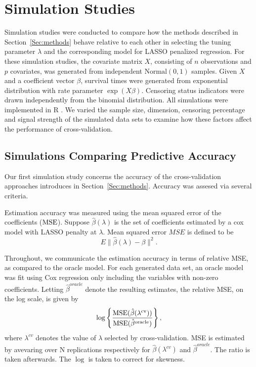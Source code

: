 \section{Simulation Studies}

Simulation studies were conducted to compare how the methods described in Section~\ref{Sec:methods} behave relative to each other in selecting the tuning parameter $\lambda$ and the corresponding model for LASSO penalized regression. For these simulation studies, the covariate matrix $X$, consisting of $n$ observations and $p$ covariates, was generated from independent $\text{Normal}(0, 1)$ samples. Given $X$ and a coefficient vector $\beta$, survival times were generated from exponential distribution with rate parameter $\exp(X\beta)$. Censoring status indicators were drawn independently from the binomial distribution. All simulations were implemented in R \citep{R}. We varied the sample size, dimension, censoring percentage and signal strength of the simulated data sets to examine how these factors affect the performance of cross-validation.
   
\subsection {Simulations Comparing Predictive Accuracy}
\label{Sec:accuracy}

Our first simulation study concerns the accuracy of the cross-validation approaches introduces in Section~\ref{Sec:methods}.  Accuracy was assesed via several criteria.

Estimation accuracy was measured using the mean squared error of the coefficients ($\textrm{MSE}$). Suppose $\hat{\beta}(\lambda)$ is the set of coefficients estimated by a cox model with LASSO penalty at $\lambda$. Mean squared error $MSE$ is defined to be 
\begin{equation}
E\| \hat{\beta}(\lambda) - \beta \| ^2.
\end{equation}

Throughout, we communicate the estimation accuracy in terms of relative MSE, as compared to the oracle model.  For each generated data set, an oracle model was fit using Cox regression only including the variables with non-zero coefficients. Letting $\hat{\beta}^{oracle}$ denote the resulting estimates, the relative MSE, on the log scale, is given by
\begin{equation}
\log\left\{ \frac{\textrm{MSE}(\hat{\beta}(\lambda^{\text{cv}}))}{\textrm{MSE}(\hat{\beta}^{\text{oracle}})} \right\},
\end{equation}
where $\lambda^{cv}$ denotes the value of $\lambda$ selected by cross-validation. MSE is estimated by avevaring over N replications respectively for $\hat{\beta}(\lambda^{cv})$ and $\hat{\beta}^{oracle}$. The ratio is taken afterwards. The $\log$ is taken to correct for skewness. %

